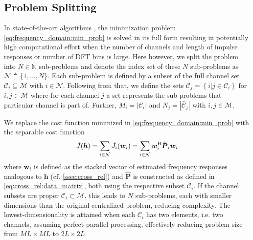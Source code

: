 \documentclass{article}
\newcommand{\hf}{{\bm{h}}}
\newcommand{\wf}{{\bm{w}}}
\newcommand{\aRhof}{{\bm{{P}}}}
\newcommand{\Cset}{\mathcal{C}}
\newcommand{\Csetb}{\bar{\mathcal{C}}}
\newcommand{\Mset}{\mathcal{M}}
\newcommand{\Nset}{\mathcal{N}}
\begin{document}
\subsection{Problem Splitting}
\label{ssec:problem_splitting}
In state-of-the-art algorithms \cite{heNoiseRobustFrequencyDomain2018,habetsOnlineQuasiNewtonAlgorithm2010}, the minimization problem \eqref{eq:frequency_domain:min_prob} is solved in its full form resulting in potentially high computational effort when the number of channels and length of impulse responses or number of DFT bins is large.
Here however, we split the problem into \(N \in \mathbb{N}\) sub-problems and denote the index set of these \(N\) sub-problems as \(\Nset \triangleq \{1,\ldots,N\}\).
Each sub-problem is defined by a subset of the full channel set \(\Cset_i \subseteq \Mset\) with \(i \in \Nset\).
Following from that, we define the sets \(\Csetb_j = \left\{ i \vert j \in \Cset_i \right\}\) for \(i,j \in \Mset\) where for each channel \(j\) a set represents the sub-problems that particular channel is part of.
Further, \(M_i = \left| \Cset_i \right| \) and \(N_j = \left| \Csetb_j \right| \) with \(i,j \in \Mset\).

We replace the cost function minimized in \eqref{eq:frequency_domain:min_prob} with the separable cost function 
\begin{equation}
    \tilde{J}(\hf) = \sum_{i \in \Nset} \tilde{J}_i(\wf_i)  = \sum_{i \in \Nset} \wf_i^\herm \hat{\aRhof}_i \wf_i
    \label{eq:problem_splitting:cost_function}
\end{equation}
where \(\wf_i\) is defined as the stacked vector of estimated frequency responses analogous to \(\hf\) (cf. \autoref{ssec:cross_rel}) and \(\hat{\aRhof}\) is constructed as defined in \eqref{eq:cross_rel:data_matrix}, both using the respective subset \(\Cset_i\).
If the channel subsets are proper \(\Cset_i \subset \Mset\), this leads to \(N\) sub-problems, each with smaller dimensions than the original centralized problem, reducing complexity.
The lowest-dimensionality is attained when each \(\Cset_i\) has two elements, i.e. two channels, assuming perfect parallel processing, effectively reducing problem size from \(ML \times ML\) to \(2L \times 2L\).
\end{document}
